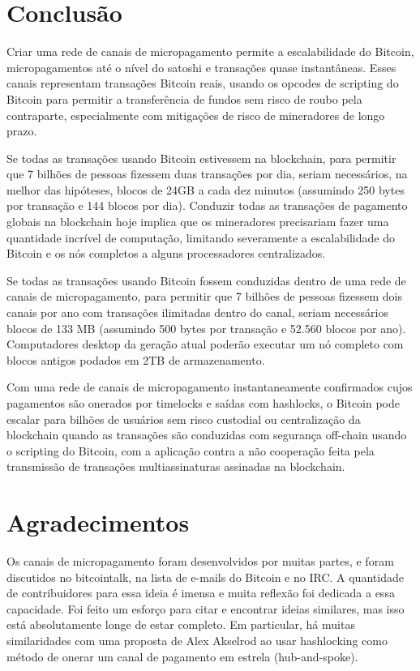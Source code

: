 \documentclass[letterpaper,11pt]{article}
\begin{document}
\section{Conclusão}

Criar uma rede de canais de micropagamento permite a escalabilidade do
Bitcoin, micropagamentos até o nível do satoshi e transações quase
instantâneas. Esses canais representam transações Bitcoin reais, usando os
opcodes de scripting do Bitcoin para permitir a transferência de fundos
sem risco de roubo pela contraparte, especialmente com mitigações de
risco de mineradores de longo prazo.

Se todas as transações usando Bitcoin estivessem na blockchain, para
permitir que 7 bilhões de pessoas fizessem duas transações por dia, seriam
necessários, na melhor das hipóteses, blocos de 24GB a cada dez minutos
(assumindo 250 bytes por transação e 144 blocos por dia). Conduzir todas
as transações de pagamento globais na blockchain hoje implica que os
mineradores precisariam fazer uma quantidade incrível de computação,
limitando severamente a escalabilidade do Bitcoin e os nós completos a
alguns processadores centralizados.

Se todas as transações usando Bitcoin fossem conduzidas dentro de uma rede
de canais de micropagamento, para permitir que 7 bilhões de pessoas
fizessem dois canais por ano com transações ilimitadas dentro do canal,
seriam necessários blocos de 133 MB (assumindo 500 bytes por transação e
52.560 blocos por ano). Computadores desktop da geração atual poderão
executar um nó completo com blocos antigos podados em 2TB de armazenamento.

Com uma rede de canais de micropagamento instantaneamente confirmados
cujos pagamentos são onerados por timelocks e saídas com hashlocks, o
Bitcoin pode escalar para bilhões de usuários sem risco custodial ou
centralização da blockchain quando as transações são conduzidas com
segurança off-chain usando o scripting do Bitcoin, com a aplicação contra
a não cooperação feita pela transmissão de transações multiassinaturas
assinadas na blockchain.

\section{Agradecimentos}

Os canais de micropagamento foram desenvolvidos por muitas partes, e
foram discutidos no bitcointalk, na lista de e-mails do Bitcoin e no IRC.
A quantidade de contribuidores para essa ideia é imensa e muita reflexão
foi dedicada a essa capacidade. Foi feito um esforço para citar e
encontrar ideias similares, mas isso está absolutamente longe de estar
completo. Em particular, há muitas similaridades com uma proposta de
Alex Akselrod ao usar hashlocking como método de onerar um canal de
pagamento em estrela (hub-and-spoke).
\end{document}
